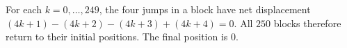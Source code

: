 For each $k=0,\ldots,249$, the four jumps in a block have net displacement $(4k+1)-(4k+2)-(4k+3)+(4k+4)=0$. All $250$ blocks therefore return to their initial positions. The final position is $\boxed0$.

